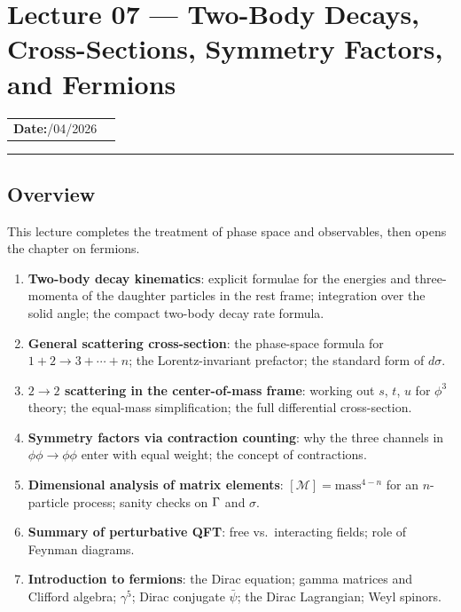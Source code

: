 \documentclass[../main.tex]{subfiles}
\begin{document}
\section{Lecture 07 — Two-Body Decays, Cross-Sections, Symmetry Factors, and Fermions}\label{sec:lec07}
\begin{center}
\begin{tabular}{ll}
  \textbf{Date:}\quad 30/04/2026   & \\
\end{tabular}
\end{center}
\hrule\vspace{1.5em}
\subsection*{Overview}

This lecture completes the treatment of phase space and observables, then opens the chapter on fermions.

\begin{enumerate}
  \item \textbf{Two-body decay kinematics}: explicit formulae for the energies and three-momenta of the daughter particles in the rest frame; integration over the solid angle; the compact two-body decay rate formula.
  \item \textbf{General scattering cross-section}: the phase-space formula for $1+2 \to 3+\cdots+n$; the Lorentz-invariant prefactor; the standard form of $d\sigma$.
  \item \textbf{$2\to2$ scattering in the center-of-mass frame}: working out $s$, $t$, $u$ for $\phi^3$ theory; the equal-mass simplification; the full differential cross-section.
  \item \textbf{Symmetry factors via contraction counting}: why the three channels in $\phi\phi\to\phi\phi$ enter with equal weight; the concept of contractions.
  \item \textbf{Dimensional analysis of matrix elements}: $[\mathcal{M}] = \text{mass}^{4-n}$ for an $n$-particle process; sanity checks on $\Gamma$ and $\sigma$.
  \item \textbf{Summary of perturbative QFT}: free vs.\ interacting fields; role of Feynman diagrams.
  \item \textbf{Introduction to fermions}: the Dirac equation; gamma matrices and Clifford algebra; $\gamma^5$; Dirac conjugate $\bar\psi$; the Dirac Lagrangian; Weyl spinors.
\end{enumerate}
\end{document}
